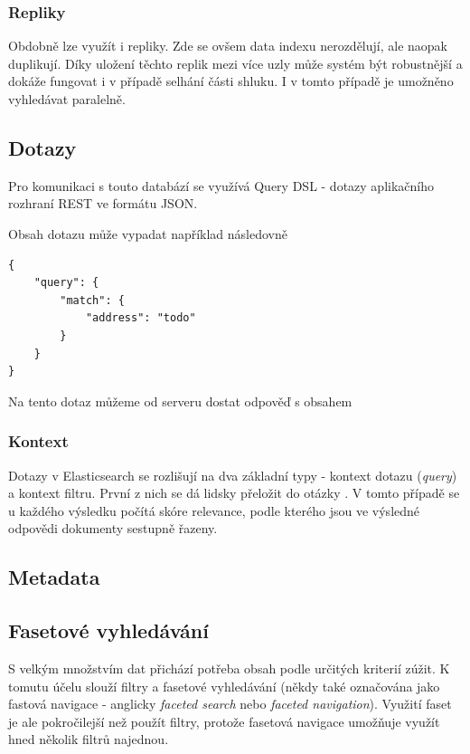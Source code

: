 \subsubsection*{Repliky}
Obdobně lze využít i repliky. Zde se ovšem data indexu nerozdělují, ale naopak duplikují. Díky uložení těchto replik mezi více uzly může systém být robustnější a dokáže fungovat i v případě selhání části shluku. I v tomto případě je umožněno vyhledávat paralelně. 

\subsection{Dotazy}
Pro komunikaci s touto databází se využívá Query DSL - dotazy aplikačního rozhraní REST ve formátu JSON.

Obsah dotazu může vypadat například následovně
\begin{verbatim}
{
    "query": {
        "match": {
            "address": "todo"
        }
    }
}
\end{verbatim} %

Na tento dotaz můžeme od serveru dostat odpověď s obsahem

\blindtext

\subsubsection*{Kontext}
Dotazy v Elasticsearch se rozlišují na dva základní typy - kontext dotazu (\emph{query}) a kontext filtru.
První z nich se dá lidsky přeložit do otázky . V tomto případě se u každého výsledku počítá skóre relevance, podle kterého jsou ve výsledné odpovědi dokumenty sestupně řazeny.

\subsection{Metadata}
\blindtext

\subsection{Fasetové vyhledávání}
S velkým množstvím dat přichází potřeba obsah podle určitých kriterií zúžit. K tomutu účelu slouží filtry a fasetové vyhledávání (někdy také označována jako fastová navigace - anglicky \emph{faceted search} nebo \emph{faceted navigation}). Využití faset je ale pokročilejší než použít filtry, protože fasetová navigace umožňuje využít hned několik filtrů najednou. %

